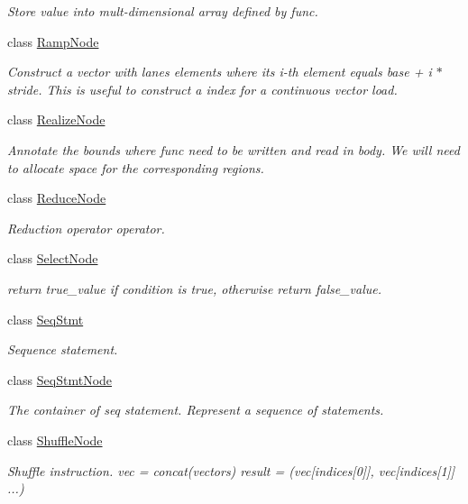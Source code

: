 \begin{DoxyCompactItemize}
\begin{DoxyCompactList}\small\item\em Store value into mult-\/dimensional array defined by func. \end{DoxyCompactList}\item 
class \hyperlink{classtvm_1_1tir_1_1RampNode}{Ramp\+Node}
\begin{DoxyCompactList}\small\item\em Construct a vector with lanes elements where its i-\/th element equals base + i $\ast$ stride. This is useful to construct a index for a continuous vector load. \end{DoxyCompactList}\item 
class \hyperlink{classtvm_1_1tir_1_1RealizeNode}{Realize\+Node}
\begin{DoxyCompactList}\small\item\em Annotate the bounds where func need to be written and read in body. We will need to allocate space for the corresponding regions. \end{DoxyCompactList}\item 
class \hyperlink{classtvm_1_1tir_1_1ReduceNode}{Reduce\+Node}
\begin{DoxyCompactList}\small\item\em Reduction operator operator. \end{DoxyCompactList}\item 
class \hyperlink{classtvm_1_1tir_1_1SelectNode}{Select\+Node}
\begin{DoxyCompactList}\small\item\em return true\+\_\+value if condition is true, otherwise return false\+\_\+value. \end{DoxyCompactList}\item 
class \hyperlink{classtvm_1_1tir_1_1SeqStmt}{Seq\+Stmt}
\begin{DoxyCompactList}\small\item\em Sequence statement. \end{DoxyCompactList}\item 
class \hyperlink{classtvm_1_1tir_1_1SeqStmtNode}{Seq\+Stmt\+Node}
\begin{DoxyCompactList}\small\item\em The container of seq statement. Represent a sequence of statements. \end{DoxyCompactList}\item 
class \hyperlink{classtvm_1_1tir_1_1ShuffleNode}{Shuffle\+Node}
\begin{DoxyCompactList}\small\item\em Shuffle instruction. vec = concat(vectors) result = (vec\mbox{[}indices\mbox{[}0\mbox{]}\mbox{]}, vec\mbox{[}indices\mbox{[}1\mbox{]}\mbox{]} ...) \end{DoxyCompactList}\item 

\end{DoxyCompactItemize}
